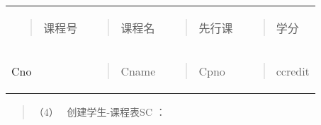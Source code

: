 \documentclass[
]{article}
\begin{document}
\begin{longtable}[]{@{}llll@{}}
\toprule
\endhead
\begin{minipage}[t]{0.22\columnwidth}\raggedright
\begin{quote}
课程号
\end{quote}\strut
\end{minipage} & \begin{minipage}[t]{0.22\columnwidth}\raggedright
\begin{quote}
课程名
\end{quote}\strut
\end{minipage} & \begin{minipage}[t]{0.22\columnwidth}\raggedright
\begin{quote}
先行课
\end{quote}\strut
\end{minipage} & \begin{minipage}[t]{0.22\columnwidth}\raggedright
\begin{quote}
学分
\end{quote}\strut
\end{minipage}\tabularnewline
\begin{minipage}[t]{0.22\columnwidth}\raggedright
Cno\strut
\end{minipage} & \begin{minipage}[t]{0.22\columnwidth}\raggedright
\begin{quote}
Cname
\end{quote}\strut
\end{minipage} & \begin{minipage}[t]{0.22\columnwidth}\raggedright
\begin{quote}
Cpno
\end{quote}\strut
\end{minipage} & \begin{minipage}[t]{0.22\columnwidth}\raggedright
\begin{quote}
ccredit
\end{quote}\strut
\end{minipage}\tabularnewline
\bottomrule
\end{longtable}

\begin{quote}
（4）~ 创建学生-课程表SC ：
\end{quote}
\end{document}
